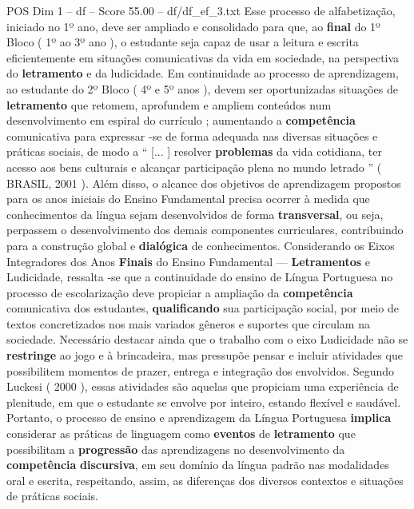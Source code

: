 \begin{textsample}{POS Dim 1 – df – Score 55.00 – df/df\_ef\_3.txt}
Esse processo de alfabetização, iniciado no 1º ano, deve ser ampliado e consolidado para que, ao \textbf{final} do 1º Bloco ( 1º ao 3º ano ), o estudante seja capaz de usar a leitura e escrita eficientemente em situações comunicativas da vida em sociedade, na perspectiva do \textbf{letramento} e da ludicidade.
Em continuidade ao processo de aprendizagem, ao estudante do 2º Bloco ( 4º e 5º anos ), devem ser oportunizadas situações de \textbf{letramento} que retomem, aprofundem e ampliem conteúdos num desenvolvimento em espiral do currículo ; aumentando a \textbf{competência} comunicativa para expressar -se de forma adequada nas diversas situações e práticas sociais, de modo a “ [... ] resolver \textbf{problemas} da vida cotidiana, ter acesso aos bens culturais e alcançar participação plena no mundo letrado ” ( BRASIL, 2001 ).
Além disso, o alcance dos objetivos de aprendizagem propostos para os anos iniciais do Ensino Fundamental precisa ocorrer à medida que conhecimentos da língua sejam desenvolvidos de forma \textbf{transversal}, ou seja, perpassem o desenvolvimento dos demais componentes curriculares, contribuindo para a construção global e \textbf{dialógica} de conhecimentos.
Considerando os Eixos Integradores dos Anos \textbf{Finais} do Ensino Fundamental — \textbf{Letramentos} e Ludicidade, ressalta -se que a continuidade do ensino de Língua Portuguesa no processo de escolarização deve propiciar a ampliação da \textbf{competência} comunicativa dos estudantes, \textbf{qualificando} sua participação social, por meio de textos concretizados nos mais variados gêneros e suportes que circulam na sociedade.
Necessário destacar ainda que o trabalho com o eixo Ludicidade não se \textbf{restringe} ao jogo e à brincadeira, mas pressupõe pensar e incluir atividades que possibilitem momentos de prazer, entrega e integração dos envolvidos.
Segundo Luckesi ( 2000 ), essas atividades são aquelas que propiciam uma experiência de plenitude, em que o estudante se envolve por inteiro, estando flexível e saudável.
Portanto, o processo de ensino e aprendizagem da Língua Portuguesa \textbf{implica} considerar as práticas de linguagem como \textbf{eventos} de \textbf{letramento} que possibilitam a \textbf{progressão} das aprendizagens no desenvolvimento da \textbf{competência} \textbf{discursiva}, em seu domínio da língua padrão nas modalidades oral e escrita, respeitando, assim, as diferenças dos diversos contextos e situações de práticas sociais.

\end{textsample}
